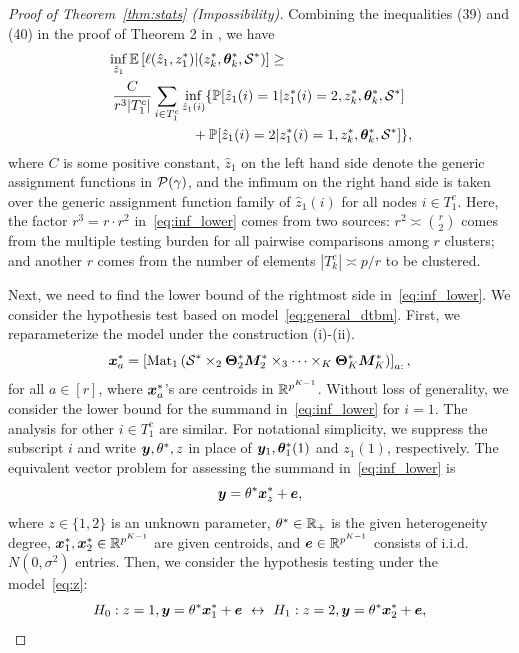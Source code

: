\documentclass[journal]{IEEEtran}
\theoremstyle{definition}
\theoremstyle{definition}
\newcommand{\of}[1]{\left(#1\right)}
\newcommand{\off}[1]{\left[#1\right]}
\begin{document}
\begin{proof}[Proof of Theorem~\ref{thm:stats} (Impossibility)]
   Combining the inequalities (39) and (40) in the proof of Theorem 2 in \cite{gao2018community}, we have 
   \begin{align}
        & \inf_{\hat z_1 } \bbE \left[ \ell(\hat z_1, z_1^*) | (z^*_k, \mtheta^*_k, \tS^*)  \right] \geq  \\
        & \  \frac{C}{r^3 |T_1^c|} \sum_{i \in T_1^c} \inf_{\hat z_1  (i)} \{ \bbP[\hat z_1(i) = 1| z_1^*(i) = 2, z_k^*, \mtheta_k^*, \tS^*] \\
        & \quad \quad \quad  \quad  \quad \quad +   \bbP[\hat z_1(i) = 2| z_1^*(i) = 1, z_k^*, \mtheta_k^*, \tS^*] \},\label{eq:inf_lower}
   \end{align}
   where $C$ is some positive constant,  $\hat z_1$ on the left hand side denote the generic assignment functions in $\mathcal{P}(\gamma)$, and the infimum on the right hand side is taken over the generic assignment function family of $\hat z_1(i)$ for all nodes $i \in T_1^c$. Here, the factor $r^3=r\cdot r^2$ in~\eqref{eq:inf_lower} comes from two sources: $r^2\asymp {r\choose 2}$ comes from the multiple testing burden for all pairwise comparisons among $r$ clusters; and another $r$ comes from the number of elements $|T^c_k|\asymp p/r$ to be clustered. 
   
   Next, we need to find the lower bound of the rightmost side in~\eqref{eq:inf_lower}. 
We consider the hypothesis test based on model~\eqref{eq:general_dtbm}. First, we reparameterize the model under the construction (i)-(ii).
\begin{equation}
    \mx_a^* = \off{\mat_1 \of{ \tS^*\times_2 \mTheta_2^* \mM_2^*\times_3\cdots \times_K \mTheta^*_K \mM_K^* }}_{a:},
\end{equation}
for all $a \in [r]$, where $\bm x_a^*$'s are centroids in $\mathbb{R}^{p^{K-1}}$. Without loss of generality, we consider the lower bound for the summand in~\eqref{eq:inf_lower} for $i=1$. The analysis for other $i\in T^c_1$ are similar. For notational simplicity, we suppress the subscript $i$ and write $\bm{y}, \theta^*, z$ in place of $\bm{y}_1, \boldsymbol{\theta}_1^*(1)$ and $z_1(1)$, respectively. The equivalent vector problem for assessing the summand in~\eqref{eq:inf_lower} is
\begin{equation}\label{eq:z}
\my=\theta^* \mx_{z}^*+\me,
\end{equation}
where $z\in \{1,2\}$ is an unknown parameter, $\theta^* \in \mathbb{R}_+$ is the given heterogeneity degree, $\bm x_1^*,\bm x_2^*\in\mathbb{R}^{p^{K-1}}$ are given centroids, and $\bm{e}\in\mathbb{R}^{p^{K-1}}$ consists of i.i.d.\ $N(0,\sigma^2)$ entries.  Then, we consider the hypothesis testing under the model~\eqref{eq:z}:
\small
\begin{equation}\label{eq:test}
 H_0: z = 1, \my = \theta^* \mx_1^* + \me \  \leftrightarrow \  H_1: z = 2, \my = \theta^* \mx_2^* + \me,
\end{equation}
\normalsize
   

\end{proof}
\end{document}
